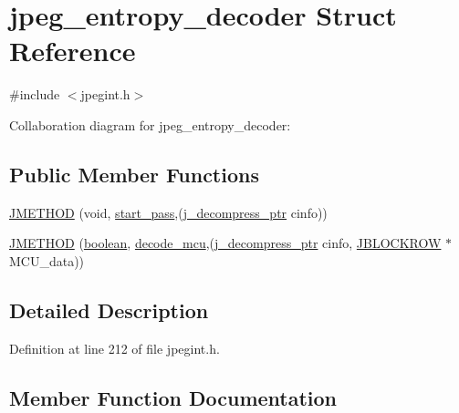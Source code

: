 \hypertarget{structjpeg__entropy__decoder}{}\section{jpeg\+\_\+entropy\+\_\+decoder Struct Reference}
\label{structjpeg__entropy__decoder}


{\ttfamily \#include $<$jpegint.\+h$>$}



Collaboration diagram for jpeg\+\_\+entropy\+\_\+decoder\+:
\subsection*{Public Member Functions}
\begin{DoxyCompactItemize}
\item 
\mbox{\hyperlink{structjpeg__entropy__decoder_ab1b90e7d9348599cecc7b6c86d291ae4}{J\+M\+E\+T\+H\+OD}} (void, \mbox{\hyperlink{jddctmgr_8c_a1964f006adb8fb80f57e455f6452aec1}{start\+\_\+pass}},(\mbox{\hyperlink{jpeglib_8h_a00c7d78af44bd26a901c791ccfc1e178}{j\+\_\+decompress\+\_\+ptr}} cinfo))
\item 
\mbox{\hyperlink{structjpeg__entropy__decoder_a151f6f7497ba68935cca4b28ee75a596}{J\+M\+E\+T\+H\+OD}} (\mbox{\hyperlink{jmorecfg_8h_a7c6368b321bd9acd0149b030bb8275ed}{boolean}}, \mbox{\hyperlink{jdhuff_8c_a35432ad418198722f261a1f66b745595}{decode\+\_\+mcu}},(\mbox{\hyperlink{jpeglib_8h_a00c7d78af44bd26a901c791ccfc1e178}{j\+\_\+decompress\+\_\+ptr}} cinfo, \mbox{\hyperlink{jpeglib_8h_a04dea0959d9bd9e8ddad83597161453b}{J\+B\+L\+O\+C\+K\+R\+OW}} $\ast$M\+C\+U\+\_\+data))
\end{DoxyCompactItemize}


\subsection{Detailed Description}


Definition at line 212 of file jpegint.\+h.



\subsection{Member Function Documentation}
\mbox{\label{structjpeg__entropy__decoder_ab1b90e7d9348599cecc7b6c86d291ae4}} 
